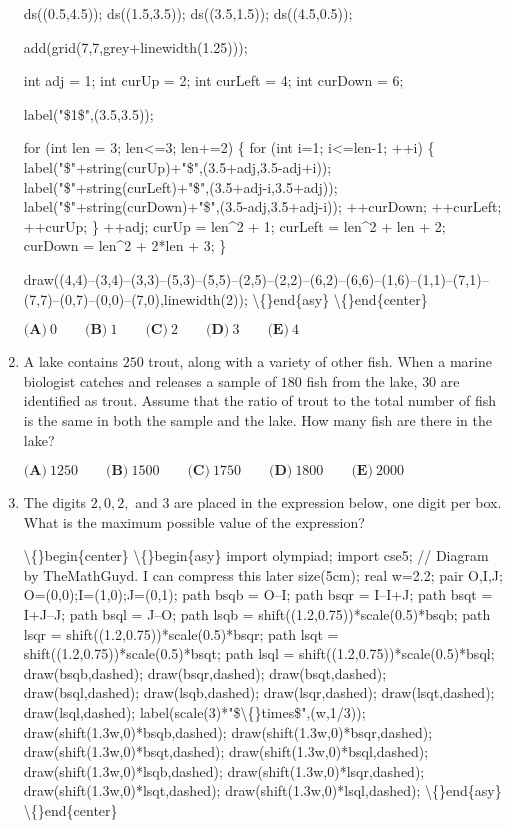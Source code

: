 \documentclass{article}
\begin{document}
\begin{enumerate}[label=\arabic*., itemsep=0.5em]
ds((0.5,4.5));
ds((1.5,3.5));
ds((3.5,1.5));
ds((4.5,0.5));

add(grid(7,7,grey+linewidth(1.25)));

int adj = 1;
int curUp = 2;
int curLeft = 4;
int curDown = 6;

label("\$1\$",(3.5,3.5));

for (int len = 3; len<=3; len+=2)
\{
	for (int i=1; i<=len-1; ++i) 
   		\{
			label("\$"+string(curUp)+"\$",(3.5+adj,3.5-adj+i));
    		label("\$"+string(curLeft)+"\$",(3.5+adj-i,3.5+adj)); 
    		label("\$"+string(curDown)+"\$",(3.5-adj,3.5+adj-i));
    		++curDown;
    		++curLeft;
    		++curUp;
		\}
	++adj;
    curUp = len\^{}2 + 1;
    curLeft = len\^{}2 + len + 2;
    curDown = len\^{}2 + 2*len + 3;
\}

draw((4,4)--(3,4)--(3,3)--(5,3)--(5,5)--(2,5)--(2,2)--(6,2)--(6,6)--(1,6)--(1,1)--(7,1)--(7,7)--(0,7)--(0,0)--(7,0),linewidth(2));
\textbackslash\{\}end\{asy\}
\textbackslash\{\}end\{center\}

\(\textbf{(A)}\ 0 \qquad \textbf{(B)}\ 1 \qquad \textbf{(C)}\ 2 \qquad \textbf{(D)}\ 3 \qquad \textbf{(E)}\ 4\)\par \vspace{0.5em}\item A lake contains \(250\) trout, along with a variety of other fish. When a marine biologist catches and releases a sample of \(180\) fish from the lake, \(30\) are identified as trout. Assume that the ratio of trout to the total number of fish is the same in both the sample and the lake. How many fish are there in the lake?

\(\textbf{(A)}\ 1250 \qquad \textbf{(B)}\ 1500 \qquad \textbf{(C)}\ 1750 \qquad \textbf{(D)}\ 1800 \qquad \textbf{(E)}\ 2000\)\par \vspace{0.5em}\item The digits \(2, 0, 2,\) and \(3\) are placed in the expression below, one digit per box. What is the maximum possible value of the expression?


\textbackslash\{\}begin\{center\}
\textbackslash\{\}begin\{asy\}
import olympiad;
import cse5;
// Diagram by TheMathGuyd. I can compress this later
size(5cm);
real w=2.2;
pair O,I,J;
O=(0,0);I=(1,0);J=(0,1);
path bsqb = O--I;
path bsqr = I--I+J;
path bsqt = I+J--J;
path bsql = J--O;
path lsqb = shift((1.2,0.75))*scale(0.5)*bsqb;
path lsqr = shift((1.2,0.75))*scale(0.5)*bsqr;
path lsqt = shift((1.2,0.75))*scale(0.5)*bsqt;
path lsql = shift((1.2,0.75))*scale(0.5)*bsql;
draw(bsqb,dashed);
draw(bsqr,dashed);
draw(bsqt,dashed);
draw(bsql,dashed);
draw(lsqb,dashed);
draw(lsqr,dashed);
draw(lsqt,dashed);
draw(lsql,dashed);
label(scale(3)*"\$\textbackslash\{\}times\$",(w,1/3));
draw(shift(1.3w,0)*bsqb,dashed);
draw(shift(1.3w,0)*bsqr,dashed);
draw(shift(1.3w,0)*bsqt,dashed);
draw(shift(1.3w,0)*bsql,dashed);
draw(shift(1.3w,0)*lsqb,dashed);
draw(shift(1.3w,0)*lsqr,dashed);
draw(shift(1.3w,0)*lsqt,dashed);
draw(shift(1.3w,0)*lsql,dashed);
\textbackslash\{\}end\{asy\}
\textbackslash\{\}end\{center\}



\end{enumerate}
\end{document}
